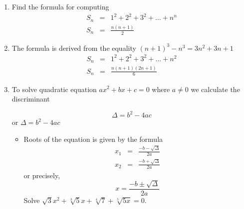 \documentclass[12pt,a4paper]{article}
\begin{document}
	\begin{enumerate}
		\item Find the formula for computing
		\begin{eqnarray}
			S_{n} &=&1^2+2^2+3^2+\dots+n^n \\
			S_{n}&=&\frac{n(n+1)}{2}
		\end{eqnarray}
		\item The formula is derived from the equality $ (n+1)^{3}-n^{3}=3n^{2}+3n+1 $
		\begin{eqnarray}
		S_{n} &=& 1^{2}+2^{2}+3^{2}+\dots+n^{2}\\
		S_{n} &=& \frac{n(n+1)(2n+1)}{6}
		\end{eqnarray}
		\item To solve quadratic equation $ ax^2+bx+c=0 $ where $ a\ne 0 $ we calculate
		the discriminant
		\begin{center}
				\[ \Delta=b^2-4ac \] or $ \Delta=b^2-4ac $
		\end{center}
	\begin{itemize}
		\item Roots of the equation is given by the formula
		\begin{eqnarray}
		x_{1} &=& \frac{-b-\sqrt{\Delta}}{2a} \\
		x_2 & = & \frac{-b+\sqrt{\Delta}}{2a}
		\end{eqnarray}
		or precisely,
		\begin{equation}
			x=\frac{-b\pm \sqrt{\Delta}}{2a}
		\end{equation}
		Solve $ \sqrt{3}x^2+\sqrt[3]{5}x+\sqrt[4]{7}+\sqrt[5]{5x}=0. $
	\end{itemize}
	\end{enumerate}
\end{document}
